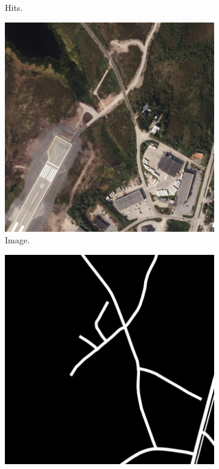 \begin{figure}[H]
\begin{subfigure}{0.23\textwidth}
\caption{Hits.}
\vspace{0.1cm} %
\end{subfigure}
\begin{subfigure}{0.23\textwidth}
\includegraphics[width=\textwidth]{figs/appendix/img1205.jpg}
\caption{ Image. }
\vspace{0.1cm} %
\end{subfigure}
\hspace*{\fill} %
\begin{subfigure}{0.23\textwidth}
\includegraphics[width=\textwidth]{figs/appendix/label1205.jpg}

\end{subfigure}
\end{figure}
